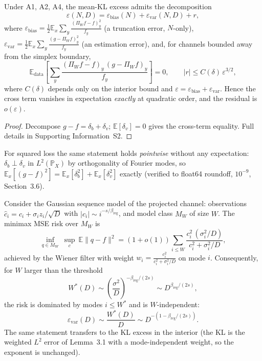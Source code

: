 \documentclass[entropy,article,submit,moreauthors,pdftex]{mdpi}
\newcommand{\eps}{\varepsilon}
\newcommand{\E}{\mathbb{E}}
\newcommand{\Prob}{\mathbb{P}}
\newcommand{\PiW}{\Pi_{W}}
\begin{document}
\begin{theorem}
\label{thm:additive}
Under A1, A2, A4, the mean-KL excess admits the decomposition
\begin{equation}
  \eps(N,D)=\eps_{\mathrm{bias}}(N)+\eps_{\mathrm{var}}(N,D)+r,
  \label{eq:decom}
\end{equation}
where $\eps_{\mathrm{bias}}=\frac12\E_x\sum_y
\frac{(\PiW f-f)_y^2}{f_y}$ (a truncation error, $N$-only),
$\eps_{\mathrm{var}}=\frac12\E_x\sum_y
\frac{(g-\PiW f)_y^2}{f_y}$ (an estimation error), and, for channels bounded
away from the simplex boundary,
\begin{equation}
  \E_{\mathrm{data}}\left[\sum_y\frac{(\PiW f-f)_y\,(g-\PiW f)_y}{f_y}\right]=0,
  \qquad |r|\le C(\delta)\,\eps^{3/2},
  \label{eq:cross}
\end{equation}
where $C(\delta)$ depends only on the interior bound and
$\eps=\eps_{\mathrm{bias}}+\eps_{\mathrm{var}}$. Hence the cross term vanishes in
expectation \emph{exactly} at quadratic order, and the residual is
$o(\eps)$.
\end{theorem}

\begin{proof}
Decompose $g-f=\delta_b+\delta_v$; $\E[\delta_v]=0$ gives the cross-term
equality. Full details in Supporting Information~S2.
\end{proof}

For squared loss the same statement holds \emph{pointwise} without any
expectation: $\delta_b\perp\delta_v$ in $L^2(\Prob_X)$ by orthogonality of
Fourier modes, so $\E_x[(g-f)^2]=\E_x[\delta_b^2]+\E_x[\delta_v^2]$ exactly
(verified to float64 roundoff, $10^{-9}$, Section~3.6).

\begin{theorem}
\label{thm:saturation}
Consider the Gaussian sequence model of the projected channel:
observations $\hat c_i=c_i+\sigma_i z_i/\sqrt{D}$ with $|c_i|\sim
i^{-s/\beta_{\mathrm{reg}}}$, and model class $M_W$ of size $W$. The minimax MSE
risk over $M_W$ is
\begin{equation}
  \inf_{q\in M_W}\ \sup_{c}\ \E\|q-f\|^2
  = (1+o(1))\sum_{i\le W}
  \frac{c_i^2\,(\sigma_i^2/D)}{c_i^2+\sigma_i^2/D},
  \label{eq:minimax}
\end{equation}
achieved by the Wiener filter with weight $w_i=
\frac{c_i^2}{c_i^2+\sigma_i^2/D}$ on mode $i$. Consequently, for $W$ larger
than the threshold
\begin{equation}
  W^*(D)\sim \left(\frac{\sigma^2}{D}\right)^{-\beta_{\mathrm{reg}}/(2s)}
  \sim D^{\beta_{\mathrm{reg}}/(2s)},
  \label{eq:Wstar}
\end{equation}
the risk is dominated by modes $i\le W^*$ and is $W$-independent:
\begin{equation}
  \eps_{\mathrm{var}}(D)\sim \frac{W^*(D)}{D}\sim
  D^{-(1-\beta_{\mathrm{reg}}/(2s))}.
  \label{eq:varstar}
\end{equation}
The same statement transfers to the KL excess in the interior (the KL is the
weighted $L^2$ error of Lemma~3.1 with a mode-independent
weight, so the exponent is unchanged).
\end{theorem}
\end{document}
